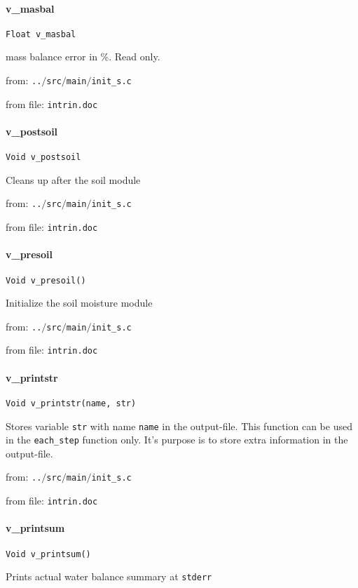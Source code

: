 \paragraph{v\_masbal}
\begin{verbatim}
Float v_masbal
\end{verbatim}
mass balance error in \%. Read only.


from: {\tt ..$/$src$/$main$/$init\_s.c}

from file: {\tt intrin.doc}


\paragraph{v\_postsoil}
\begin{verbatim}
Void v_postsoil
\end{verbatim}
Cleans up after the soil module


from: {\tt ..$/$src$/$main$/$init\_s.c}

from file: {\tt intrin.doc}


\paragraph{v\_presoil}
\begin{verbatim}
Void v_presoil()
\end{verbatim}
Initialize the soil moisture module


from: {\tt ..$/$src$/$main$/$init\_s.c}

from file: {\tt intrin.doc}


\paragraph{v\_printstr}
\begin{verbatim}
Void v_printstr(name, str)
\end{verbatim}
Stores variable {\tt str} with name {\tt name} in the output-file.
This function can be used in the {\tt each\_step} function only.
It's purpose is to store extra information in the output-file.


from: {\tt ..$/$src$/$main$/$init\_s.c}

from file: {\tt intrin.doc}


\paragraph{v\_printsum}
\begin{verbatim}
Void v_printsum()
\end{verbatim}
Prints actual water balance summary at {\tt stderr} 


